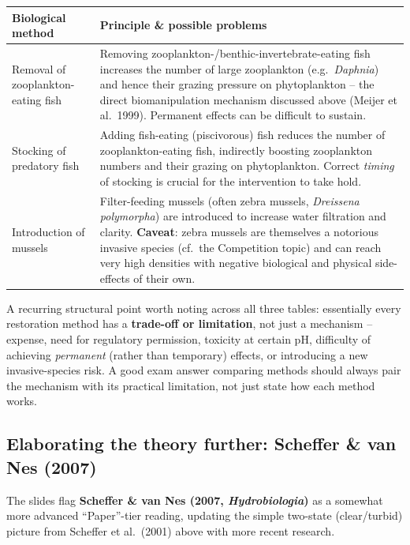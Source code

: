 \documentclass[11pt,a4paper]{article}
\begin{document}
\begin{center}
\begin{tabularx}{\textwidth}{@{}l X@{}}
\toprule
\textbf{Biological method} & \textbf{Principle \& possible problems} \\
\midrule
Removal of zooplankton-eating fish & Removing zooplankton-/benthic-invertebrate-eating fish increases the number of large zooplankton (e.g.\ \textit{Daphnia}) and hence their grazing pressure on phytoplankton -- the direct biomanipulation mechanism discussed above (Meijer et al.\ 1999). Permanent effects can be difficult to sustain. \\
Stocking of predatory fish & Adding fish-eating (piscivorous) fish reduces the number of zooplankton-eating fish, indirectly boosting zooplankton numbers and their grazing on phytoplankton. Correct \emph{timing} of stocking is crucial for the intervention to take hold. \\
Introduction of mussels & Filter-feeding mussels (often zebra mussels, \textit{Dreissena polymorpha}) are introduced to increase water filtration and clarity. \textbf{Caveat}: zebra mussels are themselves a notorious invasive species (cf.\ the Competition topic) and can reach very high densities with negative biological and physical side-effects of their own. \\
\bottomrule
\end{tabularx}
\end{center}

\begin{exambox}
A recurring structural point worth noting across all three tables: essentially every restoration method has a \textbf{trade-off or limitation}, not just a mechanism -- expense, need for regulatory permission, toxicity at certain pH, difficulty of achieving \emph{permanent} (rather than temporary) effects, or introducing a new invasive-species risk. A good exam answer comparing methods should always pair the mechanism with its practical limitation, not just state how each method works.
\end{exambox}

\subsection{Elaborating the theory further: Scheffer \& van Nes (2007)}
The slides flag \textbf{Scheffer \& van Nes (2007, \textit{Hydrobiologia})} as a somewhat more advanced ``Paper''-tier reading, updating the simple two-state (clear/turbid) picture from Scheffer et al.\ (2001) above with more recent research.
\end{document}
